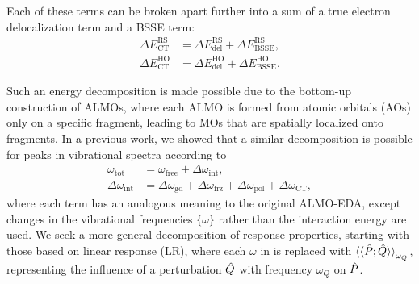 \documentclass[%
  class = book,%
  crop = false,%
  float = true,%
  multi = true,%
  preview = false,%
]{standalone}
\let\cite\autocite
\begin{document}
Each of these terms can be broken apart further into a sum of a true electron delocalization term and a BSSE term:
\begin{equation}
  \begin{aligned}
    \label{eq:almo-eda-ct-bsse}
    \Delta E_{\text{CT}}^{\text{RS}} &= \Delta E_{\text{del}}^{\text{RS}} + \Delta E_{\text{BSSE}}^{\text{RS}}, \\
    \Delta E_{\text{CT}}^{\text{HO}} &= \Delta E_{\text{del}}^{\text{HO}} + \Delta E_{\text{BSSE}}^{\text{HO}}.
  \end{aligned}
\end{equation}

Such an energy decomposition is made possible due to the bottom-up construction of ALMOs, where each ALMO is formed from atomic orbitals (AOs) only on a specific fragment, leading to MOs that are spatially localized onto fragments. In a previous work\cite{Brinzer_2015_212425}, we showed that a similar decomposition is possible for peaks in vibrational spectra according to
\begin{equation}
  \begin{aligned}
    \label{eq:almo-frequencies}
    \omega_{\text{tot}} &= \omega_{\text{free}} + \Delta \omega_{\text{int}}, \\
    \Delta \omega_{\text{int}} &= \Delta \omega_{\text{gd}} + \Delta \omega_{\text{frz}} + \Delta \omega_{\text{pol}} + \Delta \omega_{\text{CT}},
  \end{aligned}
\end{equation}
where each term has an analogous meaning to the original ALMO-EDA, except changes in the vibrational frequencies \(\{\omega\}\) rather than the interaction energy are used. We seek a more general decomposition of response properties, starting with those based on linear response (LR), where each \(\omega\) in  is replaced with \(\braket{\braket{\hat{P}; \hat{Q}}}_{\omega_{Q}}\), representing the influence of a perturbation \(\hat{Q}\) with frequency \(\omega_{Q}\) on \(\hat{P}\).
\end{document}
